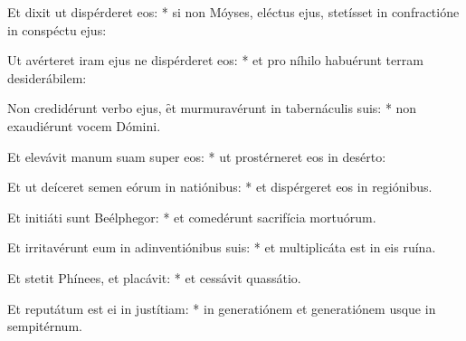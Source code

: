\begin{psalmus}
Et dixit ut dispérderet eos: * si non Móyses, eléctus ejus, stetísset in confractióne in conspéctu ejus:

Ut avérteret iram ejus ne dispérderet eos: * et pro níhilo habuérunt terram desiderábilem:

Non credidérunt verbo ejus, \f et murmuravérunt in tabernáculis suis: * non exaudiérunt vocem Dómini.

Et elevávit manum suam super eos: * ut prostérneret eos in desérto:

Et ut deíceret semen eórum in natiónibus: * et dispérgeret eos in regiónibus.

Et initiáti sunt Beélphegor: * et comedérunt sacrifícia mortuórum.

Et irritavérunt eum in adinventiónibus suis: * et multiplicáta est in eis ruína.

Et stetit Phínees, et placávit: * et cessávit quassátio.

Et reputátum est ei in justítiam: * in generatiónem et generatiónem usque in sempitérnum.

\end{psalmus}
